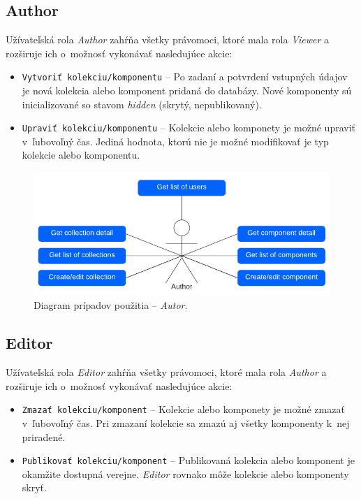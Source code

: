 \subsection{Author}
Užívateľská rola \emph{Author} zahŕňa všetky právomoci, ktoré mala rola \emph{Viewer} a rozširuje ich o~možnosť vykonávať nasledujúce akcie:

\begin{itemize}
	\item \texttt{Vytvoriť kolekciu/komponentu} -- Po zadaní a potvrdení vstupných údajov je nová kolekcia alebo komponent pridaná do databázy. Nové komponenty sú inicializované so stavom \emph{hidden} (skrytý, nepublikovaný).
	\item \texttt{Upraviť kolekciu/komponentu} -- Kolekcie alebo komponety je možné upraviť v~ľubovoľný čas. Jediná hodnota, ktorú nie je možné modifikovať je typ kolekcie alebo komponentu.
\end{itemize}

\begin{figure}[h]
	\centering
	\includegraphics[scale=0.9]{obrazky-figures/author_use_case}
	\caption{Diagram prípadov použitia -- \emph{Autor}.}
\end{figure}

\subsection{Editor}
Užívateľská rola \emph{Editor} zahŕňa všetky právomoci, ktoré mala rola \emph{Author} a rozširuje ich o~možnosť vykonávať nasledujúce akcie:

\begin{itemize}
	\item \texttt{Zmazať kolekciu/komponent} -- Kolekcie alebo komponety je možné zmazať v~ľubovoľný čas. Pri zmazaní kolekcie sa zmazú aj všetky komponenty k~nej priradené.
	\item \texttt{Publikovať kolekciu/komponent} -- Publikovaná kolekcia alebo komponent je okamžite dostupná verejne. \emph{Editor} rovnako môže kolekcie alebo komponenty skryť.
\end{itemize}

